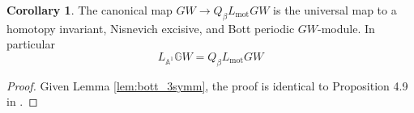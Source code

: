 \documentclass[edeposit,fullpage]{uiucthesis2009}
\newcommand{\mbb}{\mathbb}
\DeclareMathOperator{\iHom}{\mathbf{Hom}}
\theoremstyle{plain}
\newtheorem{lemma}{Lemma}
\numberwithin{lemma}{section}
\theoremstyle{definition}
\newtheorem{corollary}[lemma]{Corollary}
\begin{document}
\begin{corollary}\label{cor:MotLoc_GW}
The canonical map $GW \rightarrow Q_{\beta}L_{\mathrm{mot}}GW$ is the universal
map to a homotopy invariant, Nisnevich excisive, and Bott periodic
$GW$-module. In particular
\[
L_{\mbb A^1}\mbb GW = Q_{\beta}L_{\mathrm{mot}}GW
\]
\end{corollary}

\begin{proof}
Given Lemma \ref{lem:bott_3symm}, the proof is identical to
Proposition 4.9 in \cite{cdhdesc}.
\end{proof}








\end{document}
